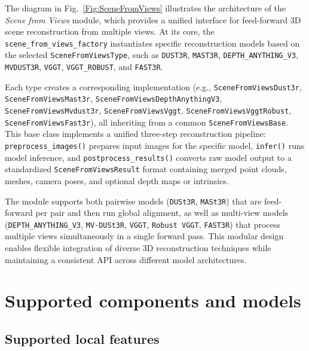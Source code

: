 \documentclass{article}
\begin{document}
The diagram in Fig.~\ref{Fig:SceneFromViews} illustrates the architecture of the \textit{Scene from Views} module, which provides a unified interface for feed-forward 3D scene reconstruction from multiple views. At its core, the \texttt{scene\_from\_views\_factory} instantiates specific reconstruction models based on the selected \texttt{SceneFromViewsType}, such as \texttt{DUST3R}\cite{wang2023dust3r}, \texttt{MAST3R}\cite{leroy2024grounding}, \texttt{DEPTH\_ANYTHING\_V3}\cite{depthanything3}, \texttt{MVDUST3R}\cite{tang2025mv}, \texttt{VGGT}\cite{wang2025vggt}, \texttt{VGGT\_ROBUST}\cite{vggt_robust}, and \texttt{FAST3R}\cite{yang2025fast3r}.

Each type creates a corresponding implementation (e.g., \texttt{SceneFromViewsDust3r}, \texttt{SceneFromViewsMast3r}, \texttt{SceneFromViewsDepthAnythingV3}, \texttt{SceneFromViewsMvdust3r}, \texttt{SceneFromViewsVggt}, \texttt{SceneFromViewsVggtRobust}, \texttt{SceneFromViewsFast3r}), all inheriting from a common \texttt{SceneFromViewsBase}. This base class implements a unified three-step reconstruction pipeline: \texttt{preprocess\_images()} prepares input images for the specific model, \texttt{infer()} runs model inference, and \texttt{postprocess\_results()} converts raw model output to a standardized \texttt{SceneFromViewsResult} format containing merged point clouds, meshes, camera poses, and optional depth maps or intrinsics.

The module supports both pairwise models (\texttt{DUSt3R}\cite{wang2023dust3r}, \texttt{MASt3R}\cite{leroy2024grounding}) that are feed-forward per pair and then run global alignment, as well as multi-view models (\texttt{DEPTH\_ANYTHING\_V3}\cite{depthanything3}, \texttt{MV-DUSt3R}\cite{tang2025mv}, \texttt{VGGT}\cite{wang2025vggt}, \texttt{Robust VGGT}\cite{vggt_robust}, \texttt{FAST3R}\cite{yang2025fast3r}) that process multiple views simultaneously in a single forward pass. This modular design enables flexible integration of diverse 3D reconstruction techniques while maintaining a consistent API across different model architectures.

\FloatBarrier


\hypertarget{supported-components-and-models}{%
\section{Supported components and
models}\label{supported-components-and-models}}

\hypertarget{supported-local-features}{%
\subsection{Supported local
features}\label{supported-local-features}}
\end{document}
